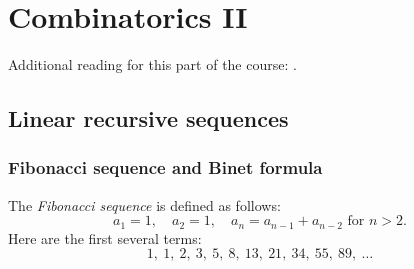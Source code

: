 \chapter{Combinatorics II}
Additional reading for this part of the course: \cite{Aig07}.

\section{Linear recursive sequences}
\subsection{Fibonacci sequence and Binet formula}
The \emph{Fibonacci sequence} is defined as follows:
\[
a_1 = 1, \quad a_2 = 1, \quad a_n = a_{n-1} + a_{n-2} \text{ for }n > 2.
\]
Here are the first several terms:
\[
1,\ 1,\ 2,\ 3,\ 5,\ 8,\ 13,\ 21,\ 34,\ 55,\ 89,\ \ldots
\]
